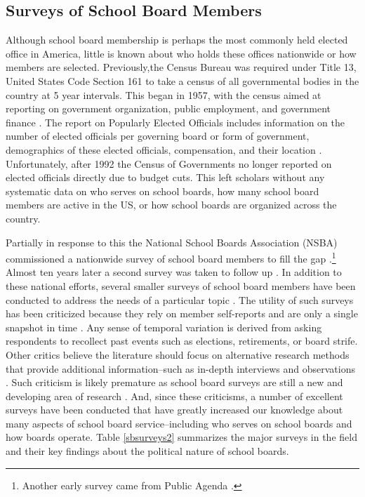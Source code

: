 \subsection{Surveys of School Board Members}

Although school board membership is perhaps the most commonly held elected office 
in America, little is known about who holds these offices nationwide or how members 
are selected. Previously,the Census Bureau was required under Title 13, United 
States Code Section 161 to take a census of all governmental bodies in the country 
at 5 year intervals. This began in 1957, with the census aimed at reporting on 
government organization, public employment, and government finance \citep{RefWorks:324}. 
The report on Popularly Elected Officials includes information on the number of 
elected officials per governing board or form of government, demographics of 
these elected officials, compensation, and their location \citep{RefWorks:325}. 
Unfortunately, after 1992 the Census of Governments no longer reported on elected 
officials directly due to budget cuts. This left scholars without any systematic 
data on who serves on school boards, how many school board members are active in 
the US, or how school boards are organized across the country. 

Partially in response to this the National School Boards Association (NSBA) 
commissioned a nationwide survey of school board members to fill the gap 
\citep{RefWorks:321}.\footnote{Another early survey came from Public Agenda 
\citep{RefWorks:330}.} Almost ten years later a second survey was taken to follow 
up \citep{RefWorks:322}. In addition to these national efforts, several smaller 
surveys of school board members have been conducted to address the needs of a 
particular topic \citep[see][]{RefWorks:264,speer1998reaching,RefWorks:311,RefWorks:328}. 
The utility of such surveys has been criticized because they rely on member 
self-reports and are only a single snapshot in time \citep{RefWorks:327}. Any 
sense of temporal variation is derived from asking respondents to recollect past 
events such as elections, retirements, or board strife. Other critics believe 
the literature should focus on alternative research methods that provide additional 
information--such as in-depth interviews and observations \citep{RefWorks:329}. 
Such criticism is likely premature as school board surveys are still a new and 
developing area of research \citep{RefWorks:312}. And, since these criticisms, 
a number of excellent surveys have been conducted that have greatly increased our 
knowledge about many aspects of school board service--including who serves on 
school boards and how boards operate. Table \ref{sbsurveys2} summarizes the 
major surveys in the field and their key findings about the political nature of 
school boards. 


